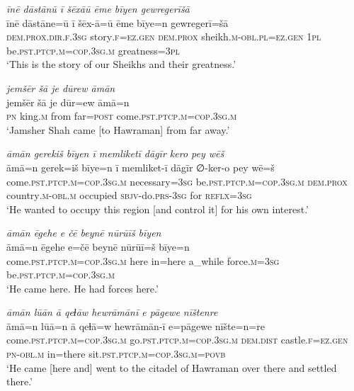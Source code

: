 \ea \label{DG.73}
\textit{īnē dāstānū ī šēxāū ēme bīyen gewregerīšā} \\ 
\gll īnē dāstāne=ū ī šēx-ā=ū ēme bīye=n gewregerī=šā \\ 
 \textsc{dem.prox}\textsc{.dir}\textsc{\textsc{.f}}\textsc{.3sg} story\textsc{\textsc{.f}}\textsc{=ez}\textsc{.gen} \textsc{dem.prox} sheikh\textsc{.m}\textsc{-obl}\textsc{.pl}=\textsc{ez.gen} \textsc{1pl} be\textsc{.pst}\textsc{.ptcp}\textsc{.m}\textsc{=cop}\textsc{.3sg}\textsc{.m} greatness\textsc{=3pl} \\ 
\glt `This is the story of our Sheikhs and their greatness.'
\z 
 

\ea \label{DP.4}
\textit{jemšēr šā je dūrew āmān} \\ 
\gll jemšēr šā je dūr=ew āmā=n \\ 
 \textsc{pn} king\textsc{.m} from far\textsc{=\textsc{post}} come\textsc{.pst}\textsc{.ptcp}\textsc{.m}\textsc{=cop}\textsc{.3sg}\textsc{.m} \\ 
\glt `Jamsher Shah came [to Hawraman] from far away.'
\z 
 
\ea \label{DP.5}
\textit{āmān gerekiš bīyen ī memliketī dāgīr kero pey wēš} \\ 
\gll āmā=n gerek=iš bīye=n ī memliket-ī dāgīr ∅-ker-o pey wē=š \\ 
 come\textsc{.pst}\textsc{.ptcp}\textsc{.m}\textsc{=cop}\textsc{.3sg}\textsc{.m} necessary\textsc{=3sg} be\textsc{.pst}\textsc{.ptcp}\textsc{.m}\textsc{=cop}\textsc{.3sg}\textsc{.m} \textsc{dem.prox} country\textsc{.m}\textsc{-obl}\textsc{.m} occupied \textsc{sbjv-}do\textsc{.prs}\textsc{-3sg} for \textsc{reflx}\textsc{=3sg} \\ 
\glt `He wanted to occupy this region [and control it] for his own interest.'
\z 
 
\ea \label{DP.7}
\textit{āmān ēgehe e čē beynē nūrūīš bīyen} \\ 
\gll āmā=n ēgehe e=čē beynē nūrūī=š bīye=n \\ 
 come\textsc{.pst}\textsc{.ptcp}\textsc{.m}\textsc{=cop}\textsc{.3sg}\textsc{.m} here in=here a\_while force\textsc{.m}\textsc{=3sg} be\textsc{.pst}\textsc{.ptcp}\textsc{.m}\textsc{=cop}\textsc{.3sg}\textsc{.m} \\ 
\glt `He came here. He had forces here.'
\z 
 
\ea \label{DP.9}
\textit{āmān lūān ā qeɫāw hewrāmānī e pāgewe nīštenre} \\ 
\gll āmā=n lūā=n ā qeɫā=w hewrāmān-ī e=pāgewe nīšte=n=re \\ 
 come\textsc{.pst}\textsc{.ptcp}\textsc{.m}\textsc{=cop}\textsc{.3sg}\textsc{.m} go\textsc{.pst}\textsc{.ptcp}\textsc{.m}\textsc{=cop}\textsc{.3sg}\textsc{.m} \textsc{dem.dist} castle\textsc{\textsc{.f}}\textsc{=ez}\textsc{.gen} \textsc{pn}\textsc{-obl}\textsc{.m} in=there sit\textsc{.pst}\textsc{.ptcp}\textsc{.m}\textsc{=cop}\textsc{.3sg}\textsc{.m}\textsc{=\textsc{povb}} \\ 
\glt `He came [here and] went to the citadel of Hawraman over there and settled there.'
\z 
 
